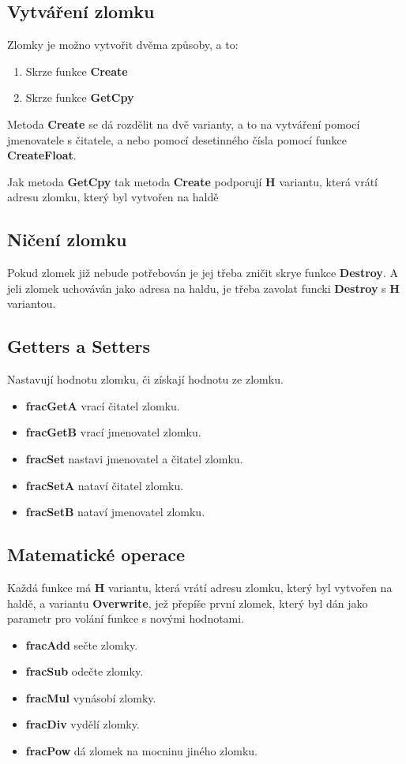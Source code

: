 \documentclass[a4paper, twocolumn, 11pt, twoside]{article}
\begin{document}
\subsection{Vytváření zlomku}
Zlomky je možno vytvořit dvěma způsoby, a to:
\begin{enumerate}
    \item Skrze funkce \textbf{Create}
    \item Skrze funkce \textbf{GetCpy}
\end{enumerate}
Metoda \textbf{Create} se dá rozdělit na dvě varianty,
a to na vytváření pomocí jmenovatele s čitatele, a nebo
pomocí desetinného čísla pomocí funkce \textbf{CreateFloat}.

Jak metoda \textbf{GetCpy} tak metoda \textbf{Create} podporují \textbf{H} variantu, která vrátí adresu 
zlomku, který byl vytvořen na haldě

\subsection{Ničení zlomku}
Pokud zlomek již nebude potřebován je jej třeba zničit 
skrye funkce \textbf{Destroy}. A jeli zlomek uchováván jako adresa na haldu,
je třeba zavolat funcki \textbf{Destroy} s \textbf{H} variantou.

\subsection{Getters a Setters}
Nastavují hodnotu zlomku, či získají hodnotu ze zlomku.

\begin{itemize}
    \item \textbf{fracGetA} vrací čitatel zlomku.
    \item \textbf{fracGetB} vrací jmenovatel zlomku.
    \item \textbf{fracSet} nastavi jmenovatel a čitatel zlomku.
    \item \textbf{fracSetA} nataví čitatel zlomku.
    \item \textbf{fracSetB} nataví jmenovatel zlomku.
\end{itemize}

\subsection{Matematické operace}

Každá funkce má \textbf{H} variantu, která vrátí adresu 
zlomku, který byl vytvořen na haldě, a variantu \textbf{Overwrite},
jež přepíše první zlomek, který byl dán jako parametr pro volání 
funkce s novými hodnotami.
\begin{itemize}
    \item \textbf{fracAdd} sečte zlomky.
    \item \textbf{fracSub} odečte zlomky.
    \item \textbf{fracMul} vynásobí zlomky.
    \item \textbf{fracDiv} vydělí zlomky.
    \item \textbf{fracPow} dá zlomek na mocninu jiného zlomku.
\end{itemize}
\end{document}
